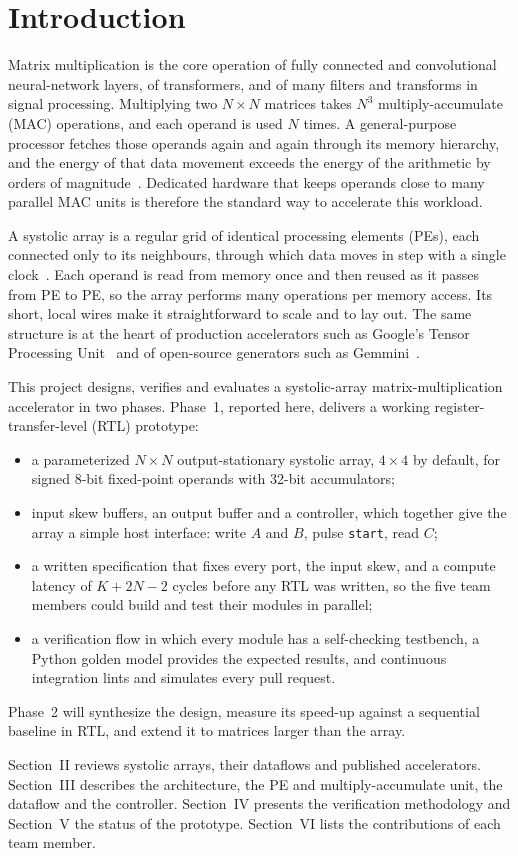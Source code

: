 
\section{Introduction}
Matrix multiplication is the core operation of fully connected and convolutional neural-network layers, of transformers, and of many filters and transforms in signal processing. Multiplying two $N \times N$ matrices takes $N^3$ multiply-accumulate (MAC) operations, and each operand is used $N$ times. A general-purpose processor fetches those operands again and again through its memory hierarchy, and the energy of that data movement exceeds the energy of the arithmetic by orders of magnitude~\cite{horowitz2014energy, sze2017efficient}. Dedicated hardware that keeps operands close to many parallel MAC units is therefore the standard way to accelerate this workload.

A systolic array is a regular grid of identical processing elements (PEs), each connected only to its neighbours, through which data moves in step with a single clock~\cite{kung1979systolic, kung1982systolic}. Each operand is read from memory once and then reused as it passes from PE to PE, so the array performs many operations per memory access. Its short, local wires make it straightforward to scale and to lay out. The same structure is at the heart of production accelerators such as Google's Tensor Processing Unit~\cite{jouppi2017tpu} and of open-source generators such as Gemmini~\cite{genc2021gemmini}.

This project designs, verifies and evaluates a systolic-array matrix-multiplication accelerator in two phases. Phase~1, reported here, delivers a working register-transfer-level (RTL) prototype:
\begin{itemize}
\item a parameterized $N \times N$ output-stationary systolic array, $4 \times 4$ by default, for signed 8-bit fixed-point operands with 32-bit accumulators;
\item input skew buffers, an output buffer and a controller, which together give the array a simple host interface: write $A$ and $B$, pulse \texttt{start}, read $C$;
\item a written specification that fixes every port, the input skew, and a compute latency of $K + 2N - 2$ cycles before any RTL was written, so the five team members could build and test their modules in parallel;
\item a verification flow in which every module has a self-checking testbench, a Python golden model provides the expected results, and continuous integration lints and simulates every pull request.
\end{itemize}
Phase~2 will synthesize the design, measure its speed-up against a sequential baseline in RTL, and extend it to matrices larger than the array.

Section~II reviews systolic arrays, their dataflows and published accelerators. Section~III describes the architecture, the PE and multiply-accumulate unit, the dataflow and the controller. Section~IV presents the verification methodology and Section~V the status of the prototype. Section~VI lists the contributions of each team member.
